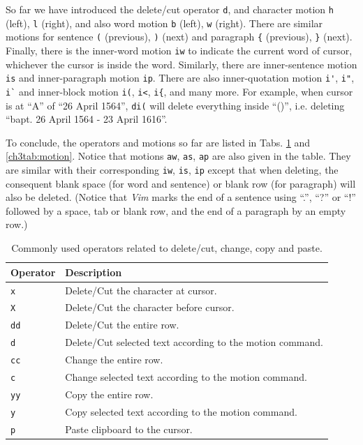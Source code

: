 So far we have introduced the delete/cut operator \verb|d|, and character motion \verb|h| (left), \verb|l| (right), and also word motion \verb|b| (left), \verb|w| (right). There are similar motions for sentence \verb|(| (previous), \verb|)| (next) and paragraph \verb|{| (previous), \verb|}| (next). Finally, there is the inner-word motion \verb|iw| to indicate the current word of cursor, whichever the cursor is inside the word. Similarly, there are inner-sentence motion \verb|is| and inner-paragraph motion \verb|ip|. There are also inner-quotation motion \verb|i'|, \verb|i"|, \verb|i`| and inner-block motion \verb|i(|, \verb|i<|, \verb|i{|, and many more. For example, when cursor is at ``A'' of ``26 April 1564'', \verb|di(| will delete everything inside ``()'', i.e. deleting ``bapt. 26 April 1564 - 23 April 1616''.

To conclude, the operators and motions so far are listed in Tabs. \ref{ch3tab:deletecut} and \ref{ch3tab:motion}. Notice that motions \verb|aw|, \verb|as|, \verb|ap| are also given in the table. They are similar with their corresponding \verb|iw|, \verb|is|, \verb|ip| except that when deleting, the consequent blank space (for word and sentence) or blank row (for paragraph) will also be deleted. (Notice that \textit{Vim} marks the end of a sentence using ``.'', ``?'' or ``!'' followed by a space, tab or blank row, and the end of a paragraph by an empty row.)

\begin{table}
  \centering \caption{Commonly used operators related to delete/cut, change, copy and paste.}\label{ch3tab:deletecut}
  \begin{tabularx}{\textwidth}{lX}
    \hline
    Operator & Description \\ \hline
    \verb|x| & Delete/Cut the character at cursor. \\ \hdashline
    \verb|X| & Delete/Cut the character before cursor. \\ \hdashline
    \verb|dd| & Delete/Cut the entire row. \\ \hdashline
    \verb|d| & Delete/Cut selected text according to the motion command. \\ \hdashline
    \verb|cc| & Change the entire row. \\ \hdashline
    \verb|c| & Change selected text according to the motion command. \\ \hdashline
    \verb|yy| & Copy the entire row. \\ \hdashline
    \verb|y| & Copy selected text according to the motion command. \\ \hdashline
    \verb|p| & Paste clipboard to the cursor. \\
    \hline
  \end{tabularx}
\end{table}

